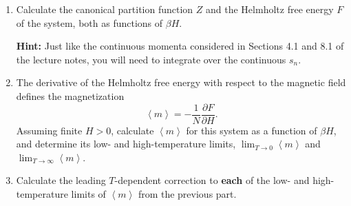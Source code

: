 \documentclass[12 pt]{article} %
\newcommand{\be}{\ensuremath{\beta} }
\newcommand{\vev}[1]{\ensuremath{\left\langle #1 \right\rangle} }
\newcommand{\pderiv}[2]{\ensuremath{\frac{\partial #1}{\partial #2}} }
\newcommand{\showmarks}[1]{\rightline{\texttt{[#1 marks]}}} %
\begin{document}
\begin{enumerate}[label={(\alph*)}]
  \item Calculate the canonical partition function $Z$ and the Helmholtz free energy $F$ of the system, both as functions of $\be H$.

        \textbf{Hint:} Just like the continuous momenta considered in Sections 4.1 and 8.1 of the lecture notes, you will need to integrate over the continuous $s_n$.

  \showmarks{8}

  \item The derivative of the Helmholtz free energy with respect to the magnetic field defines the magnetization
        \begin{equation*}
          \vev{m} = -\frac{1}{N} \pderiv{F}{H}.
        \end{equation*}
        Assuming finite $H > 0$, calculate $\vev{m}$ for this system as a function of $\be H$, and determine its low- and high-temperature limits, $\displaystyle \lim_{T \to 0} \vev{m}$ and $\displaystyle \lim_{T \to \infty} \vev{m}$.

  \showmarks{8}

\item Calculate the leading $T$-dependent correction to \textbf{each} of the low- and high-temperature limits of $\vev{m}$ from the previous part.

  \showmarks{8}
\end{enumerate}



\end{document}
